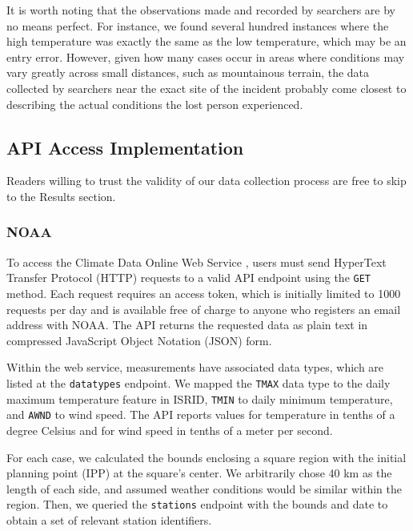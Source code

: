 \documentclass[12pt]{article}
\begin{document}
      It is worth noting that the observations made and recorded by searchers
      are by no means perfect. For instance, we found several hundred instances
      where the high temperature was exactly the same as the low temperature,
      which may be an entry error. However, given how many cases occur in areas
      where conditions may vary greatly across small distances, such as
      mountainous terrain, the data collected by searchers near the exact site
      of the incident probably come closest to describing the actual conditions
      the lost person experienced.

    \subsection{API Access Implementation}
      Readers willing to trust the validity of our data collection process are
      free to skip to the Results section.

      \subsubsection{NOAA}
        To access the Climate Data Online Web Service \cite{noaa}, users must
        send HyperText Transfer Protocol (HTTP) requests to a valid API
        endpoint using the \texttt{GET} method. Each request requires an access
        token, which is initially limited to 1000 requests per day and is
        available free of charge to anyone who registers an email address with
        NOAA. The API returns the requested data as plain text in compressed
        JavaScript Object Notation (JSON) form.

        Within the web service, measurements have associated data types, which
        are listed at the \texttt{datatypes} endpoint. We mapped the
        \texttt{TMAX} data type to the daily maximum temperature feature in
        ISRID, \texttt{TMIN} to daily minimum temperature, and \texttt{AWND} to
        wind speed. The API reports values for temperature in tenths of a
        degree Celsius and for wind speed in tenths of a meter per second.

        For each case, we calculated the bounds enclosing a square region with
        the initial planning point (IPP) at the square's center. We arbitrarily
        chose 40 km as the length of each side, and assumed weather conditions
        would be similar within the region. Then, we queried the
        \texttt{stations} endpoint with the bounds and date to obtain a set of
        relevant station identifiers.
\end{document}
